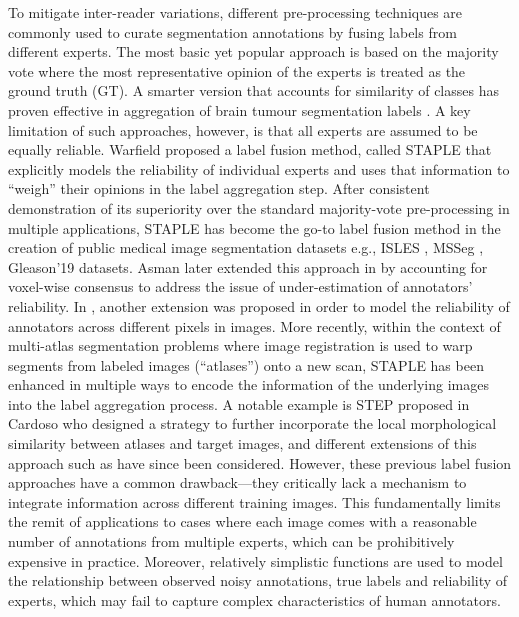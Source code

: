 To mitigate inter-reader variations, different pre-processing techniques are commonly used to curate segmentation annotations by fusing labels from different experts. The most basic yet popular approach is based on the majority vote where the most representative opinion of the experts is treated as the ground truth (GT). A smarter version that accounts for similarity of classes has proven effective in aggregation of brain tumour segmentation labels \cite{menze2014multimodal}. A key limitation of such approaches, however, is that all experts are assumed to be equally reliable. Warfield \etal \cite{warfield2004simultaneous} proposed a label fusion method, called STAPLE that explicitly models the reliability of individual experts and uses that information to ``weigh'' their opinions in the label aggregation step. After consistent demonstration of its superiority over the standard majority-vote pre-processing in multiple applications, STAPLE has become the go-to label fusion method in the creation of public medical image segmentation datasets e.g., ISLES \cite{winzeck2018isles}, MSSeg \cite{commowick2018objective}, Gleason'19 \cite{gleason2019} datasets. Asman \etal later extended this approach in \cite{asman2011robust} by accounting for voxel-wise consensus to address the issue of under-estimation of annotators' reliability. In \cite{asman2012formulating}, another extension was proposed in order to model the reliability of annotators across different pixels in images. More recently, within the context of multi-atlas segmentation problems \cite{iglesias2013unified} where image registration is used to warp segments from labeled images (``atlases'') onto a new scan, STAPLE has been enhanced in multiple ways to encode the information of the underlying images into the label aggregation process. A notable example is STEP proposed in Cardoso \etal \cite{cardoso2013steps} who designed a strategy to further incorporate the local morphological similarity between atlases and target images, and different extensions of this approach such as \cite{asman2013non,akhondi2014logarithmic} have since been considered. However, these previous label fusion approaches have a common drawback---they critically lack a mechanism to integrate information across different training images. This fundamentally limits the remit of applications to cases where each image comes with a reasonable number of annotations from multiple experts, which can be prohibitively expensive in practice. Moreover, relatively simplistic functions are used to model the relationship between observed noisy annotations, true labels and reliability of experts, which may fail to capture complex characteristics of human annotators.


